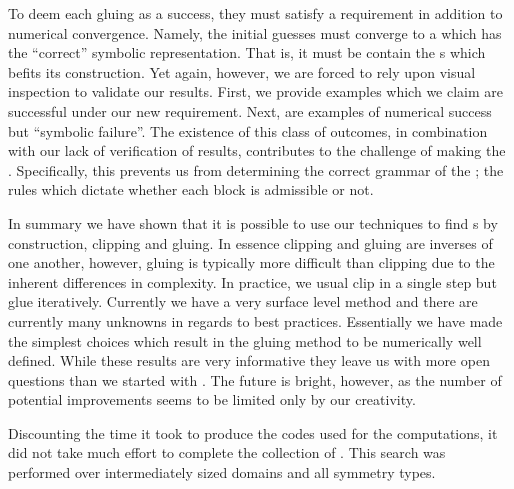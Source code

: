 To deem each gluing as a success, they must satisfy a {\symbolic} requirement
in addition to numerical convergence. Namely, the initial guesses must converge
to a {\po} which has the ``correct'' symbolic representation.
That is, it must be contain the {\fpo}s which befits its construction.
Yet again, however, we are forced to rely upon visual inspection to validate our results.
First, we provide examples which we claim are successful under our new requirement.
Next, are examples of numerical success but ``symbolic failure''.
The existence of this class of outcomes, in combination with our lack of verification of results,
contributes to the challenge of making the {\symbolic}. Specifically,
this prevents us from determining the correct grammar of
the {\symbolic}; the rules which dictate whether each {block} is admissible {\po} or not.

In summary we have shown that it is possible to use our techniques to find {\po}s by construction,
clipping and gluing. In essence
clipping and gluing are inverses of one another, however, gluing is
typically more difficult than clipping due to the inherent differences in complexity. In practice,
we usual clip in a single step but glue iteratively.
Currently we have a very surface level method and there are currently many unknowns in regards to best practices. Essentially we have made the simplest choices which result in the gluing method to be
numerically well defined. While these results are very informative they leave us with more open
questions than we started with . The future is bright, however, as the number of potential improvements seems to be limited only by our creativity.

Discounting the time it took to produce the codes used for
the computations, it did not take much effort to complete the
collection of \twots. This search was performed over intermediately
sized domains and all symmetry types.

